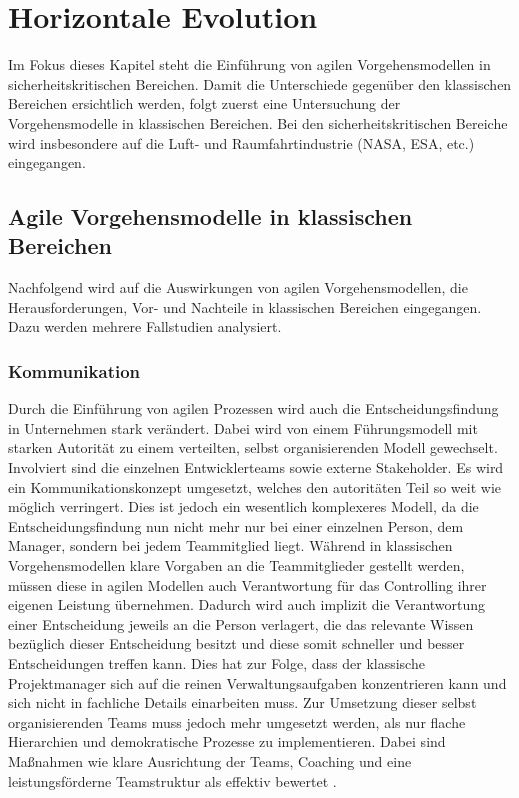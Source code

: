 \chapter{Horizontale Evolution} \label{sec:horizontal} %

Im Fokus dieses Kapitel steht die Einführung von agilen Vorgehensmodellen in sicherheitskritischen Bereichen.
Damit die Unterschiede gegenüber den klassischen Bereichen ersichtlich werden, folgt zuerst eine Untersuchung der Vorgehensmodelle in klassischen Bereichen.
Bei den sicherheitskritischen Bereiche wird insbesondere auf die Luft- und Raumfahrtindustrie (NASA, ESA, etc.) eingegangen.

\section{Agile Vorgehensmodelle in klassischen Bereichen} %

Nachfolgend wird auf die Auswirkungen von agilen Vorgehensmodellen, die Herausforderungen, Vor- und Nachteile in klassischen Bereichen eingegangen.
Dazu werden mehrere Fallstudien analysiert.

\subsection{Kommunikation} %

Durch die Einführung von agilen Prozessen wird auch die Entscheidungsfindung in Unternehmen stark verändert.
Dabei wird von einem Führungsmodell mit starken Autorität zu einem verteilten, selbst organisierenden Modell gewechselt.
Involviert sind die einzelnen Entwicklerteams sowie externe Stakeholder.
Es wird ein Kommunikationskonzept umgesetzt, welches den autoritäten Teil so weit wie möglich verringert.
Dies ist jedoch ein wesentlich komplexeres Modell, da die Entscheidungsfindung nun nicht mehr nur bei einer einzelnen Person, dem Manager, sondern bei jedem Teammitglied liegt.
Während in klassischen Vorgehensmodellen klare Vorgaben an die Teammitglieder gestellt werden, müssen diese in agilen Modellen auch Verantwortung für das Controlling ihrer eigenen Leistung übernehmen.
Dadurch wird auch implizit die Verantwortung einer Entscheidung jeweils an die Person verlagert, die das relevante Wissen bezüglich dieser Entscheidung besitzt und diese somit schneller und besser Entscheidungen treffen kann.
Dies hat zur Folge, dass der klassische Projektmanager sich auf die reinen Verwaltungsaufgaben konzentrieren kann und sich nicht in fachliche Details einarbeiten muss.
Zur Umsetzung dieser selbst organisierenden Teams muss jedoch mehr umgesetzt werden, als nur flache Hierarchien und demokratische Prozesse zu implementieren.
Dabei sind Maßnahmen wie klare Ausrichtung der Teams, Coaching und eine leistungsförderne Teamstruktur als effektiv bewertet \parencite[vgl.][S. 863 f.]{Moe:2012aa}.

